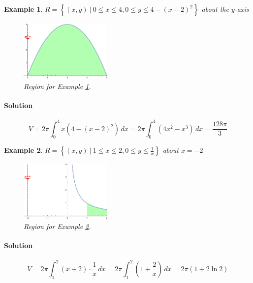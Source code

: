 \documentclass[letterpaper, 11pt, openany]{book}
\theoremstyle{mytheoremstyle}
\theoremstyle{myexamplestyle}
\newtheorem{example}{Example}[section]
\newenvironment{solution}{\paragraph{\sffamily \smaller \fontseries{b}\selectfont Solution}}{\hfill\faSquare}
\begin{document}
\begin{example}
    \label{e:volshparabola}$R = \left\{ (x,y) \ | \ 0 \leq x \leq 4, 0 \leq y \leq 4-\left( x - 2 \right)^{2} \right\}$ about the $y$-axis
    \begin{figure}[htbp]
        \centering
            \includegraphics[width=0.4\textwidth]{Figures/volshparabola.pdf}
        \caption{Region for Example \ref{e:volshparabola}.}
        \label{f:volshparabola}
    \end{figure}
    
    \begin{solution}
        \[V = 2\pi \int_{0}^{4} x\left( 4-\left( x - 2 \right)^{2} \right) \, dx = 2\pi \int_{0}^{4} \left( 4x^{2} - x^{3} \right)\, dx = \frac{128\pi}{3}\]
    \end{solution}
\end{example}

\begin{example}
    \label{e:volshrecip}$R = \left\{ (x,y) \ | \ 1 \leq x \leq 2, 0 \leq y \leq \frac{1}{x} \right\}$ about $x = -2$
    \begin{figure}[htbp]
        \centering
            \includegraphics[width=0.4\textwidth]{Figures/volshrecip.pdf}
        \caption{Region for Example \ref{e:volshrecip}.}
        \label{f:volshrecip}
    \end{figure}
    
    \begin{solution}
        \[V = 2\pi\int_{1}^{2}\left( x+ 2 \right)\cdot\frac{1}{x}\, dx = 2\pi\int_{1}^{2} \left( 1 + \frac{2}{x} \right)\, dx = 2\pi \left( 1 + 2 \ln 2 \right)\]
    \end{solution}
\end{example}
\end{document}
